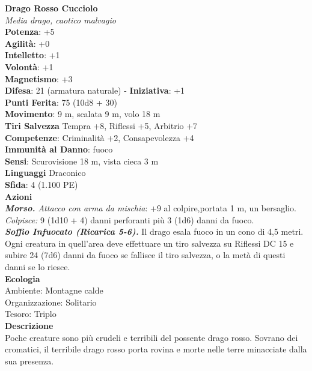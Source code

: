 \begin{multicols}{2}
\medskip\textbf{Drago Rosso Cucciolo}\\
\emph{Media drago, caotico malvagio}\\
\textbf{Potenza}: +5\\
\textbf{Agilità}: +0\\
\textbf{Intelletto}: +1\\
\textbf{Volontà}: +1\\
\textbf{Magnetismo}: +3\\
\textbf{Difesa}: 21 (armatura naturale) - \textbf{Iniziativa}: +1\\
\textbf{Punti Ferita}: 75 (10d8 + 30)\\
\textbf{Movimento}: 9 m, scalata 9 m, volo 18 m\\
\textbf{Tiri Salvezza} Tempra +8, Riflessi +5, Arbitrio +7\\
\textbf{Competenze}: Criminalità +2, Consapevolezza +4\\
\textbf{Immunità al Danno}: fuoco\\
\textbf{Sensi}: Scurovisione 18 m, vista cieca 3 m\\
\textbf{Linguaggi} Draconico\\
\textbf{Sfida}: 4 (1.100 PE)\smallskip\\
\smallskip\textbf{Azioni}\\
\emph{\textbf{Morso.} Attacco con arma da mischia}: +9 al colpire,portata 1 m, un bersaglio. \\
\emph{Colpisce:} 9 (1d10 + 4) danni perforanti più 3 (1d6) danni da fuoco.\\
\emph{\textbf{Soffio Infuocato (Ricarica 5-6).}} Il drago esala fuoco in un cono di 4,5 metri. Ogni creatura in quell'area deve effettuare un tiro salvezza su Riflessi DC  15 e subire 24 (7d6) danni da fuoco se fallisce il tiro salvezza, o la metà di questi danni se lo riesce.\\
\textbf{Ecologia}\\
Ambiente: Montagne calde\\
Organizzazione: Solitario\\
Tesoro: Triplo\\
\textbf{Descrizione}\\
Poche creature sono più crudeli e terribili del possente drago rosso. Sovrano dei cromatici, il terribile drago rosso porta rovina e morte nelle terre minacciate dalla sua presenza.\\


\end{multicols}
